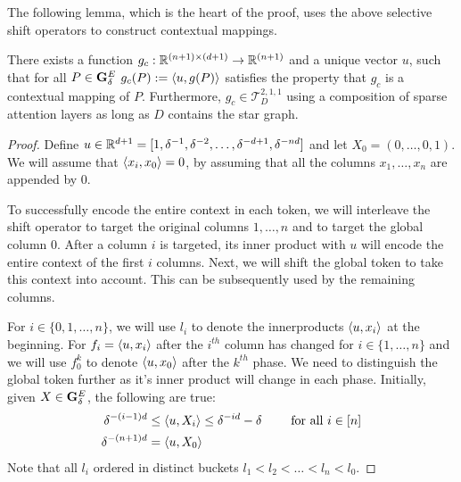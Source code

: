 The following lemma, which is the heart of the proof, uses the above selective shift operators
to construct contextual mappings. 

\begin{lemma}
    \label{lem:contextual}
    There  exists  a function $g_c: \mathbb{R}^{(n+1) \times (d+1)} \to \mathbb{R}^{(n+1)} $ and 
    a unique vector $u$, such that for all $P \in \mathbf{G}^{E}_{\delta}$ $g_c(P) := \left \langle u, g(P) \right \rangle$ 
    satisfies the property that $g_c$ is a  contextual mapping of $P$. 
    Furthermore, $g_c \in \mathcal{T}_D^{2,1,1}$ using a composition of sparse attention layers
    as long as $D$ contains the star graph. 
\end{lemma}
\begin{proof}
    Define $u \in \mathbb{R}^{d+1} = [1,\delta^{-1},\delta^{-2},\dots, \delta^{-d+1},\delta^{-nd}]$ and let 
    $X_{0} = (0,\dots,0,1)$.  We will assume that $\left \langle x_i, x_0 \right \rangle=0$, by assuming that all the 
    columns $x_1,\dots, x_n$ are appended by $0$. 
    
    To successfully encode the entire context in each token, we will interleave the shift operator
    to target the original columns $1,\dots,n$ and to target the global column $0$. After a column $i$ is targeted, its inner product with $u$ will encode the entire context of the first $i$ columns. 
    Next, we will shift the global token to take this context into account. This can be subsequently used by the  remaining columns.    
    
    For $i \in \{0,1,\dots,n\} $, we will use  $l_i$ to denote the innerproducts $\left \langle u, x_i \right \rangle$ at the beginning. For 
    $f_i = \left \langle u, x_i \right \rangle$ after the $i^{th}$ column has changed for $i \in \{1,\dots,n\}$ and we will use
    $f_0^k $ to denote $\left \langle u, x_0 \right \rangle$ after the $k^{th}$ phase. We need to distinguish the global token  
    further as it's inner product will change in each phase. 
    Initially, given  $X \in \mathbf{G}^{E}_{\delta}$, the following are true:
    \begin{align*}
     \delta^{-(i-1)d} &\leq \left \langle u, X_{i} \right \rangle \leq \delta^{-id}-\delta \qquad \text{ for all } i \in [n]  \\
     \delta^{-(n+1)d} &= \left \langle u, X_{0} \right \rangle 
    \end{align*}
   Note that all $l_i$ ordered in distinct buckets $l_1 < l_2 < \dots < l_n <l_0$. 
    

\end{proof}
